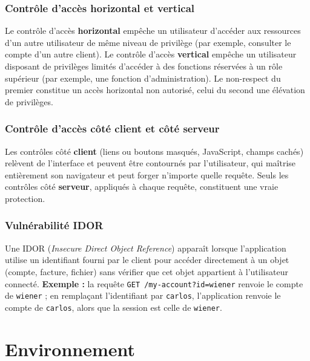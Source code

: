 \documentclass{rapportENSIAS}
\begin{document}
\subsubsection*{Contrôle d'accès horizontal et vertical}
Le contrôle d'accès \textbf{horizontal} empêche un utilisateur d'accéder aux ressources d'un autre utilisateur de même niveau de privilège (par exemple, consulter le compte d'un autre client). Le contrôle d'accès \textbf{vertical} empêche un utilisateur disposant de privilèges limités d'accéder à des fonctions réservées à un rôle supérieur (par exemple, une fonction d'administration). Le non-respect du premier constitue un accès horizontal non autorisé, celui du second une élévation de privilèges.

\subsubsection*{Contrôle d'accès côté client et côté serveur}
Les contrôles côté \textbf{client} (liens ou boutons masqués, JavaScript, champs cachés) relèvent de l'interface et peuvent être contournés par l'utilisateur, qui maîtrise entièrement son navigateur et peut forger n'importe quelle requête. Seuls les contrôles côté \textbf{serveur}, appliqués à chaque requête, constituent une vraie protection.

\subsubsection*{Vulnérabilité IDOR}
Une IDOR (\textit{Insecure Direct Object Reference}) apparaît lorsque l'application utilise un identifiant fourni par le client pour accéder directement à un objet (compte, facture, fichier) sans vérifier que cet objet appartient à l'utilisateur connecté. \textbf{Exemple :} la requête \texttt{GET /my-account?id=wiener} renvoie le compte de \texttt{wiener} ; en remplaçant l'identifiant par \texttt{carlos}, l'application renvoie le compte de \texttt{carlos}, alors que la session est celle de \texttt{wiener}.

\section{Environnement}
\end{document}
